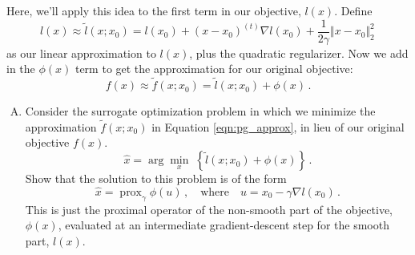 \documentclass{article}
\newcommand{\prox}{ \mathop{\mathrm{prox}} }
\newcommand{\enorm}[1]{\Vert #1 \Vert_2}
\begin{document}
Here, we'll apply this idea to the first term in our objective, $l(x)$. Define
$$
l(x) \approx \tilde{l}(x; x_0) = l(x_0) + (x - x_0)^{(t)} \nabla l(x_0) + \frac{1}{2\gamma} \enorm{x - x_0}^2 \, 
$$
as our linear approximation to $l(x)$, plus the quadratic regularizer.  Now we add in the $\phi(x)$ term to get the approximation for our original objective:
\begin{equation}
\label{eqn:pg_approx}
f(x) \approx \tilde{f}(x; x_0) = \tilde{l}(x; x_0) + \phi(x)   \, .
\end{equation}

\begin{enumerate}[(A)]
\item Consider the surrogate optimization problem in which we minimize the approximation $\tilde{f}(x; x_0)$ in Equation \ref{eqn:pg_approx}, in lieu of our original objective $f(x)$. 
$$
\hat{x} = \arg \min_x \; \left\{   \tilde{l}(x; x_0) + \phi(x)  \right\} \, .
$$
Show that the solution to this problem is of the form
\begin{equation}
\label{eqn:pg_xhat}
\hat{x} = \prox_{\gamma} \phi(u) \, , \quad \mbox{where} \quad u = x_0 - \gamma \nabla l(x_0) \, .
\end{equation}
This is just the proximal operator of the non-smooth part of the objective, $\phi(x)$, evaluated at an intermediate gradient-descent step for the smooth part, $l(x)$.


\end{enumerate}
\end{document}
